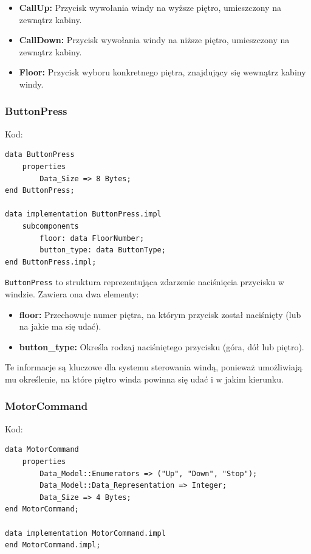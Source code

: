 \documentclass{article}
\begin{document}
    \begin{itemize}
        \item \textbf{CallUp:} Przycisk wywołania windy na wyższe piętro, umieszczony na zewnątrz kabiny.
        \item \textbf{CallDown:} Przycisk wywołania windy na niższe piętro, umieszczony na zewnątrz kabiny.
        \item \textbf{Floor:} Przycisk wyboru konkretnego piętra, znajdujący się wewnątrz kabiny windy.
    \end{itemize}


    \subsubsection{ButtonPress}

    Kod:
    
    \begin{lstlisting}[basicstyle=\ttfamily, keywordstyle=\bfseries]
data ButtonPress
    properties
        Data_Size => 8 Bytes; 
end ButtonPress;

data implementation ButtonPress.impl
    subcomponents
        floor: data FloorNumber;
        button_type: data ButtonType;
end ButtonPress.impl;
    \end{lstlisting}

    \texttt{ButtonPress} to struktura reprezentująca zdarzenie naciśnięcia przycisku w windzie. Zawiera ona dwa elementy:

    \begin{itemize}
        \item \textbf{floor:} Przechowuje numer piętra, na którym przycisk został naciśnięty (lub na jakie ma się udać).
        \item \textbf{button\_type:} Określa rodzaj naciśniętego przycisku (góra, dół lub piętro).
    \end{itemize}

    Te informacje są kluczowe dla systemu sterowania windą, ponieważ umożliwiają mu określenie, na które piętro winda powinna się udać i w jakim kierunku.



    
    \subsubsection{MotorCommand}

    Kod:
    
    \begin{lstlisting}[basicstyle=\ttfamily, keywordstyle=\bfseries]
data MotorCommand
    properties
        Data_Model::Enumerators => ("Up", "Down", "Stop");
        Data_Model::Data_Representation => Integer;
        Data_Size => 4 Bytes;
end MotorCommand;

data implementation MotorCommand.impl
end MotorCommand.impl;
    \end{lstlisting}
\end{document}
